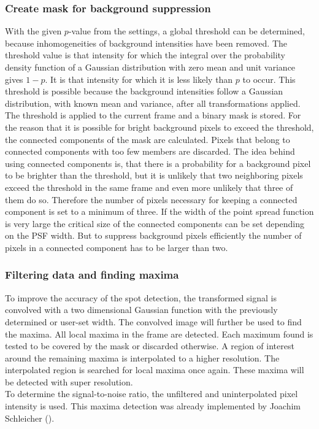 \subsubsection{Create mask for background suppression}
With the given $p$-value from the settings, a global threshold can be determined, because inhomogeneities of background intensities have been removed. The threshold value is that intensity 
for which the integral over the probability density function of a Gaussian distribution with zero mean and unit variance gives $1-p$. It is that intensity for which it is less likely than $p$ to occur. This threshold is possible because the background intensities follow a Gaussian distribution, with known mean and variance, after all transformations applied.\newline
The threshold is applied to the current frame and a binary mask is stored. For the reason that it is possible for bright background pixels to exceed the threshold, the connected components of the mask are calculated. Pixels that belong to connected components with too few members are discarded. The idea behind using connected components is, that there is a probability for a background pixel to be brighter than the threshold, but it is unlikely that two neighboring pixels exceed the threshold in the same frame and even more unlikely that three of them do so. Therefore the number of pixels necessary for keeping a connected component is set to a minimum of three. If the width of the point spread function is very large the critical size of the connected components can be set depending on the PSF width. But to suppress background pixels efficiently the number of pixels in a connected component has to be larger than two.
\subsubsection{Filtering data and finding maxima}
To improve the accuracy of the spot detection, the transformed signal is convolved with a two dimensional Gaussian function with the previously determined or user-set width. The convolved image will further be used to find the maxima. All local maxima in the frame are detected. Each maximum found is tested to be covered by the mask or discarded otherwise. A region of interest around the remaining maxima is interpolated to a higher resolution. The interpolated region is searched for local maxima once again. These maxima will be detected with super resolution.\\
To determine the signal-to-noise ratio, the unfiltered and uninterpolated pixel intensity is used.
This maxima detection was already implemented by Joachim Schleicher (\cite{MAJoachim}).
